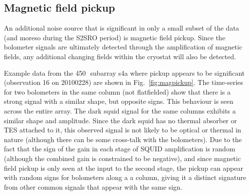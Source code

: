 \documentclass[useAMS,usenatbib,nofootinbib]{mn2e}
\begin{document}
\subsection{Magnetic field pickup}
\label{sec:magpickup}

An additional noise source that is significant in only a small subset
of the data (and moreso during the S2SRO period) is magnetic field
pickup. Since the bolometer signals are ultimately detected through
the amplification of magnetic fields, any additional changing fields
within the cryostat will also be detected.

Example data from the 450\,\micron\ subarray s4a where pickup appears
to be significant (observation 16 on 20100228) are shown in
Fig.~\ref{fig:magpickup}. The time-series for two bolometers in the
same column (not flatfielded) show that there is a strong signal with
a similar shape, but opposite signs. This behaviour is seen across the
entire array. The dark squid signal for the same columns exhibits a
similar shape and amplitude. Since the dark squid has no thermal
absorber or TES attached to it, this observed signal is not likely to
be optical or thermal in nature (although there can be some cross-talk
with the bolometers). Due to the fact that the sign of the gain in
each stage of SQUID amplification is random (although the combined
gain is constrained to be negative), and since magnetic field pickup
is only seen at the input to the second stage, the pickup can appear
with random signs for bolometers along a a column, giving it a
distinct signature from other common signals that appear with the same
sign.
\end{document}

